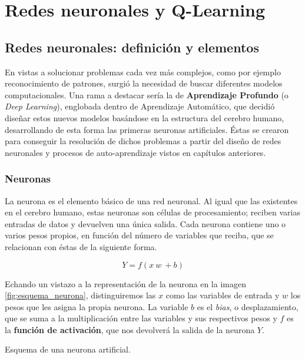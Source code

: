 \chapter{Redes neuronales y Q-Learning}
\label{cap:deepLearning}


\section{Redes neuronales: definición y elementos}
En vistas a solucionar problemas cada vez más complejos, como por ejemplo reconocimiento de patrones, surgió la necesidad de buscar diferentes modelos computacionales. Una rama a destacar sería la de \textbf{Aprendizaje Profundo} (o \textit{Deep Learning}), englobada dentro de Aprendizaje Automático, que decidió diseñar estos nuevos modelos basándose en la estructura del cerebro humano, desarrollando de esta forma las primeras neuronas artificiales. Éstas se crearon para conseguir la resolución de dichos problemas a partir del diseño de redes neuronales y procesos de auto-aprendizaje vistos en capítulos anteriores.

\subsection{Neuronas}
La neurona es el elemento básico de una red neuronal. Al igual que las existentes en el cerebro humano, estas neuronas son células de procesamiento; reciben varias entradas de datos y devuelven una única salida. Cada neurona contiene uno o varios pesos propios, en función del número de variables que reciba, que se relacionan con éstas de la siguiente forma.

$$Y = f(x\ w\ + b)$$

Echando un vistazo a la representación de la neurona en la imagen \ref{fig:esquema_neurona}, distinguiremos las $x$ como las variables de entrada y $w$ los pesos que les asigna la propia neurona. La variable $b$ es el \textit{bias}, o desplazamiento, que se suma a la multiplicación entre las variables y sus respectivos pesos y $f$ es la \textbf{función de activación}, que nos devolverá la salida de la neurona $Y$.

%
       {Esquema de una neurona artificial.}

